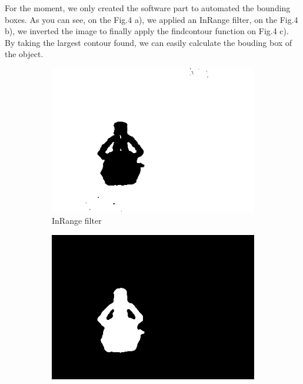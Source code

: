 \documentclass[runningheads,a4paper]{llncs}
\begin{document}
For the moment, we only created the software part to automated the bounding boxes. As you can see, on the Fig.4 a), we applied an InRange filter, on the Fig.4 b), we inverted the image to finally apply the findcontour function on Fig.4 c). By taking the largest contour found, we can easily calculate the bouding box of the object. \\
 
\begin{figure}[h!]
  \centering
  \begin{subfigure}[b]{0.3\linewidth}
    \includegraphics[width=\linewidth]{images/bounding_inrange.png}
    \caption{InRange filter}
  \end{subfigure}
  \begin{subfigure}[b]{0.3\linewidth}
    \includegraphics[width=\linewidth]{images/bounding_invert.png}

\end{subfigure}
\end{figure}
\end{document}
